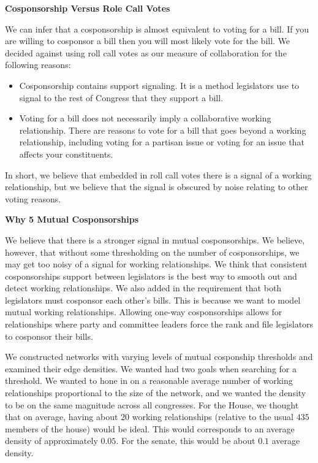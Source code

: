\textbf{Cosponsorship Versus Role Call Votes}

We can infer that a cosponsorship is almost equivalent to voting for a bill. If 
you are willing to cosponsor a bill then you will most likely vote for the bill. 
We decided against using roll call votes as our measure of collaboration for 
the following reasons:

\begin{itemize}
	\item Cosponsorship contains support signaling. It is a method legislators 
	use to signal to the rest of Congress that they support a bill.
	\item Voting for a bill does not necessarily imply a collaborative working 
	relationship. There are reasons to vote for a bill that goes beyond a 
	working relationship, including voting for a partisan issue or voting for 
	an issue that affects your constituents.
\end{itemize}

In short, we believe that embedded in roll call votes there is a signal of a 
working relationship, but we believe that the signal is obscured by noise 
relating to other voting reasons.

\textbf{Why 5 Mutual Cosponsorships}

We believe that there is a stronger signal in mutual cosponsorships. We believe, 
however, that without some thresholding on the number of cosponsorships, we may 
get too noisy of a signal for working relationships. We think that consistent 
cosponsorships support between legislators is the best way to smooth out and 
detect working relationships. We also added in the requirement that both 
legislators must cosponsor each other's bills. This is because we want to model 
mutual working relationships. Allowing one-way cosponsorships allows for 
relationships where party and committee leaders force the rank and file 
legislators to cosponsor their bills.

We constructed networks with varying levels of mutual cosponship thresholds and
examined their edge densities. We wanted had two goals when searching for a
threshold. We wanted to hone in on a reasonable average number of working
relationships proportional to the size of the network, and we wanted the density
to be on the same magnitude across all congresses. For the House, we thought 
that on average, having about $20$ working relationships (relative to the usual 
$435$ members of the house) would be ideal. This would corresponds to an average 
density of approximately $0.05$. For the senate, this would be about $0.1$ 
average density.

